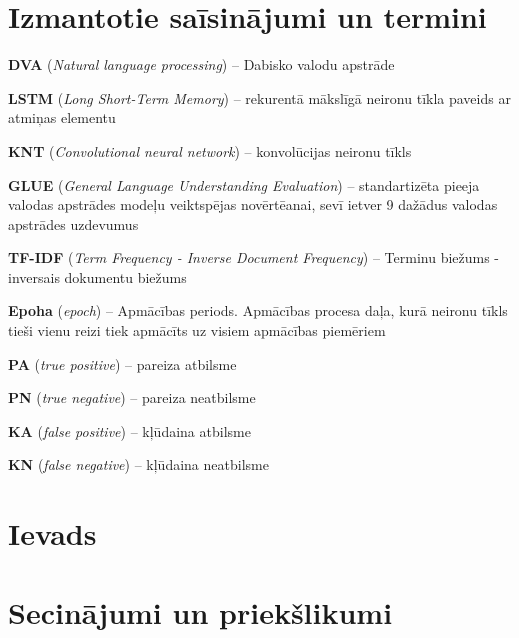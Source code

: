 \documentclass{VEA}
\begin{document}
\chapter*{Izmantotie saīsinājumi un termini}

\textbf{DVA} (\textit{Natural language processing}) – Dabisko valodu apstrāde

\textbf{LSTM} (\textit{Long Short-Term Memory}) – rekurentā mākslīgā neironu tīkla paveids ar atmiņas elementu

\textbf{KNT} (\textit{Convolutional neural network}) – konvolūcijas neironu tīkls

\textbf{GLUE} (\textit{General Language Understanding Evaluation}) – standartizēta pieeja valodas apstrādes modeļu veiktspējas novērtēanai, sevī ietver 9 dažādus valodas apstrādes uzdevumus

\textbf{TF-IDF} (\textit{Term Frequency - Inverse Document Frequency}) – Terminu biežums - inversais dokumentu biežums

\textbf{Epoha} (\textit{epoch})  – Apmācības periods. Apmācības procesa daļa, kurā neironu tīkls tieši vienu reizi tiek apmācīts uz visiem apmācības piemēriem

\textbf{PA} (\textit{true positive}) – pareiza atbilsme

\textbf{PN} (\textit{true negative}) – pareiza neatbilsme

\textbf{KA} (\textit{false positive}) – kļūdaina atbilsme

\textbf{KN} (\textit{false negative}) – kļūdaina neatbilsme

\chapter*{Ievads} %








\chapter*{Secinājumi un priekšlikumi}

\end{document}
